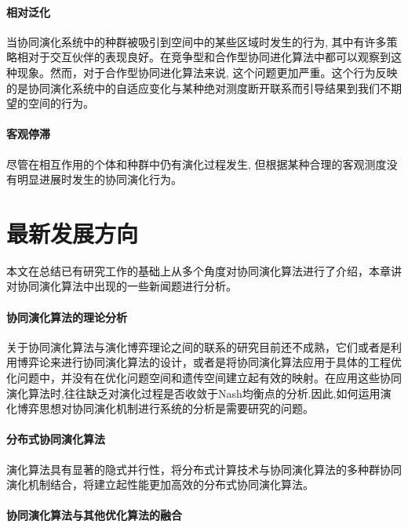\documentclass[a4paper]{article}
\begin{document}
    \paragraph{相对泛化}

    当协同演化系统中的种群被吸引到空间中的某些区域时发生的行为, 其中有许多策略相对于交互伙伴的表现良好。在竞争型和合作型协同进化算法中都可以观察到这种现象。然而，对于合作型协同进化算法来说, 这个问题更加严重。这个行为反映的是协同演化系统中的自适应变化与某种绝对测度断开联系而引导结果到我们不期望的空间的行为。

    \paragraph{客观停滞}

    尽管在相互作用的个体和种群中仍有演化过程发生, 但根据某种合理的客观测度没有明显进展时发生的协同演化行为。


    \newpage
    \section{最新发展方向}
    
    本文在总结已有研究工作的基础上从多个角度对协同演化算法进行了介绍，本章讲对协同演化算法中出现的一些新闻题进行分析。

    \paragraph{协同演化算法的理论分析}

    关于协同演化算法与演化博弈理论之间的联系的研究目前还不成熟，它们或者是利用博弈论来进行协同演化算法的设计，或者是将协同演化算法应用于具体的工程优化问题中，并没有在优化问题空间和遗传空间建立起有效的映射。在应用这些协同演化算法时,往往缺乏对演化过程是否收敛于Nash均衡点的分析.因此,如何运用演化博弈思想对协同演化机制进行系统的分析是需要研究的问题。

    \paragraph{分布式协同演化算法}

    演化算法具有显著的隐式并行性，将分布式计算技术与协同演化算法的多种群协同演化机制结合，将建立起性能更加高效的分布式协同演化算法。

    \paragraph{协同演化算法与其他优化算法的融合}
\end{document}
